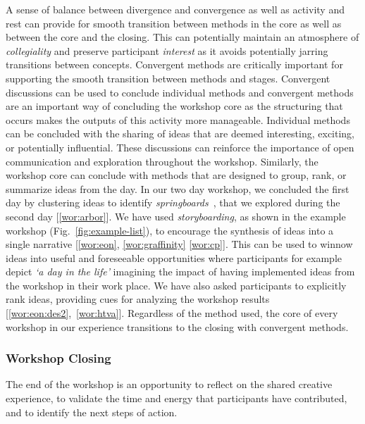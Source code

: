 A sense of balance between divergence and convergence as well as activity and rest can provide for smooth transition between methods in the core as well as between the core and the closing. This can potentially maintain an atmosphere of {\it collegiality} and preserve participant {\it interest} as it avoids potentially jarring transitions between concepts. Convergent methods are critically important for supporting the smooth transition between methods and stages. Convergent discussions can be used to conclude individual methods and convergent methods are an important way of concluding the workshop core as the structuring that occurs makes the outputs of this activity more manageable. Individual methods can be concluded with the sharing of ideas that are deemed interesting, exciting, or potentially influential. These discussions can reinforce the importance of open communication and exploration throughout the workshop. Similarly, the workshop core can conclude with methods that are designed to group, rank, or summarize ideas from the day. In our two day workshop, we concluded the first day by clustering ideas to identify \emph{springboards}~\cite{Gordon1961}, that we explored during the second day [\ref{wor:arbor}]. We have used \emph{storyboarding}, as shown in the example workshop (Fig.~\ref{fig:example-list}), to encourage the synthesis of ideas into a single narrative [\ref{wor:eon}, \ref{wor:graffinity} \ref{wor:cp}]. This can be used to winnow ideas into useful and foreseeable opportunities where participants for example depict \emph{`a day in the life'} imagining the impact of having implemented ideas from the workshop in their work place.  We have also asked participants to explicitly rank ideas, providing cues for analyzing the workshop results [\ref{wor:eon:des2},~\ref{wor:htva}]. Regardless of the method used, the core of every workshop in our experience transitions to the closing with convergent methods.

\subsubsection{Workshop Closing}

The end of the workshop is an opportunity to reflect on the shared creative experience, to validate the time and energy that participants have contributed, and to identify the next steps of action.

